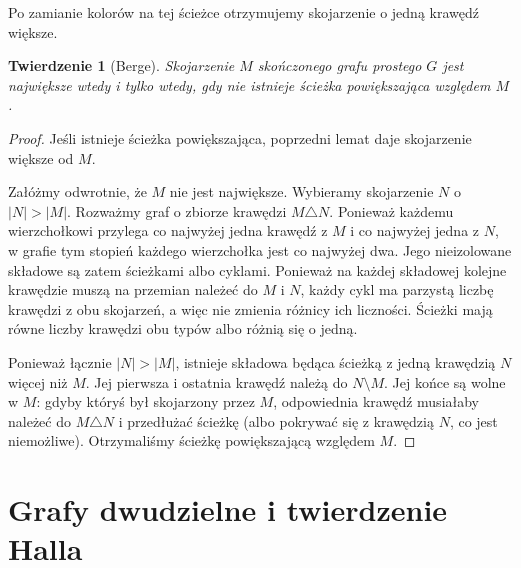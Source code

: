 \documentclass[11pt,a4paper]{report}
\numberwithin{equation}{section}
\theoremstyle{plain}
\newtheorem{twierdzenie}{Twierdzenie}[section]
\theoremstyle{definition}
\theoremstyle{remark}
\begin{document}
\begin{center}

{\footnotesize Po zamianie kolorów na tej ścieżce
otrzymujemy skojarzenie o jedną krawędź większe.}
\end{center}

\begin{twierdzenie}[Berge]
\label{thm:tg-berge}
Skojarzenie $M$ skończonego grafu prostego $G$
jest największe wtedy i tylko wtedy, gdy
nie istnieje ścieżka powiększająca względem $M$.
\end{twierdzenie}

\begin{proof}
Jeśli istnieje ścieżka powiększająca, poprzedni lemat
daje skojarzenie większe od $M$.

Załóżmy odwrotnie, że $M$ nie jest największe.
Wybieramy skojarzenie $N$ o $|N|>|M|$.
Rozważmy graf o zbiorze krawędzi $M\triangle N$.
Ponieważ każdemu wierzchołkowi przylega co najwyżej
jedna krawędź z $M$ i co najwyżej jedna z $N$,
w grafie tym stopień każdego wierzchołka jest co
najwyżej dwa. Jego nieizolowane składowe są zatem
ścieżkami albo cyklami. Ponieważ na każdej składowej
kolejne krawędzie muszą na przemian należeć do $M$
i $N$, każdy cykl ma parzystą liczbę krawędzi
z obu skojarzeń, a więc nie zmienia różnicy ich
liczności. Ścieżki mają równe liczby krawędzi
obu typów albo różnią się o jedną.

Ponieważ łącznie $|N|>|M|$, istnieje składowa
będąca ścieżką z jedną krawędzią $N$ więcej
niż $M$. Jej pierwsza i ostatnia krawędź
należą do $N\setminus M$. Jej końce są wolne
w $M$: gdyby któryś był skojarzony przez $M$,
odpowiednia krawędź musiałaby należeć do $M\triangle N$
i przedłużać ścieżkę (albo pokrywać się z krawędzią
$N$, co jest niemożliwe). Otrzymaliśmy ścieżkę
powiększającą względem $M$.
\end{proof}

\section{Grafy dwudzielne i twierdzenie Halla}
\label{sec:tg-hall}
\end{document}
